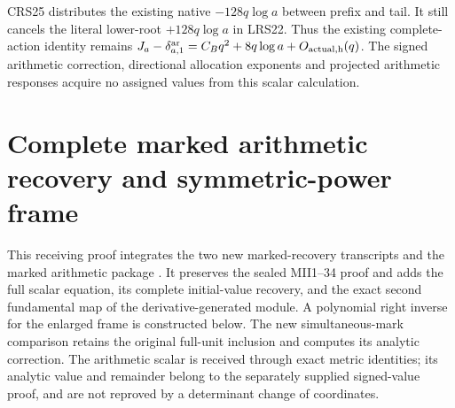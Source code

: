 CRS25 distributes the existing native $-128q\log a$ between prefix
and tail. It still cancels the literal lower-root $+128q\log a$
in LRS22. Thus the existing complete-action identity remains
$J_a-\delta^{\rm ar}_{a,1}
=C_Bq^2+8q\log a+O_{\rm actual,h}(q)$.
The signed arithmetic correction, directional allocation exponents
and projected arithmetic responses acquire no assigned values from
this scalar calculation.
\endgroup



\endgroup

\clearpage
\begingroup
\def\CC{\mathbb C}
\def\rank{\operatorname{rank}}
\def\coker{\operatorname{coker}}
\def\im{\operatorname{im}}
\def\tr{\operatorname{tr}}
\def\Sym{\operatorname{Sym}}
\def\diag{\operatorname{diag}}
\def\SF{\operatorname{SF}}

\setcounter{equation}{0}
\renewcommand{\theequation}{A02MAR.\arabic{equation}}
\section*{Complete marked arithmetic recovery and symmetric-power frame}



This receiving proof integrates the two new marked-recovery transcripts
and the marked arithmetic package \cite{a02mar:arrival}. It preserves the sealed
MII1--34 proof \cite{a02mar:mii} and adds the full scalar equation, its complete
initial-value recovery, and the exact second fundamental map of the
derivative-generated module. A polynomial right inverse for the enlarged
frame is constructed below. The new simultaneous-mark comparison retains
the original full-unit inclusion and computes its analytic correction.
The arithmetic scalar is received through exact metric identities; its
analytic value and remainder belong to the separately supplied signed-value
proof, and are not reproved by a determinant change of coordinates.

